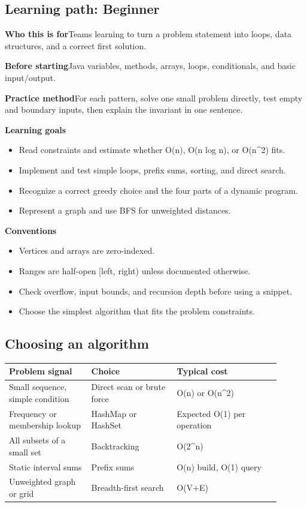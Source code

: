 \documentclass[10pt,letterpaper]{article}
\newcommand{\entrylabel}[1]{\textcolor{accent}{\bfseries #1}}
\begin{document}
\subsection*{Learning path: Beginner}
\begin{guidebox}\entrylabel{Who this is for}\quad Teams learning to turn a problem statement into loops, data structures, and a correct first solution.\par
\entrylabel{Before starting}\quad Java variables, methods, arrays, loops, conditionals, and basic input/output.\par
\entrylabel{Practice method}\quad For each pattern, solve one small problem directly, test empty and boundary inputs, then explain the invariant in one sentence.\end{guidebox}
\textbf{Learning goals}\begin{itemize}
\item Read constraints and estimate whether O(n), O(n log n), or O(n\textasciicircum{}2) fits.
\item Implement and test simple loops, prefix sums, sorting, and direct search.
\item Recognize a correct greedy choice and the four parts of a dynamic program.
\item Represent a graph and use BFS for unweighted distances.
\end{itemize}
\begin{guidebox}\textbf{Conventions}\begin{itemize}
\item Vertices and arrays are zero-indexed.
\item Ranges are half-open [left, right) unless documented otherwise.
\item Check overflow, input bounds, and recursion depth before using a snippet.
\item Choose the simplest algorithm that fits the problem constraints.
\end{itemize}\end{guidebox}
\subsection*{Choosing an algorithm}
\small\begin{longtable}{>{\raggedright\arraybackslash}p{0.27\linewidth}>{\raggedright\arraybackslash}p{0.29\linewidth}>{\raggedright\arraybackslash}p{0.34\linewidth}}\toprule
\textbf{Problem signal} & \textbf{Choice} & \textbf{Typical cost}\\\midrule\endhead
Small sequence, simple condition & Direct scan or brute force & O(n) or O(n\textasciicircum{}2)\\
Frequency or membership lookup & HashMap or HashSet & Expected O(1) per operation\\
All subsets of a small set & Backtracking & O(2\textasciicircum{}n)\\
Static interval sums & Prefix sums & O(n) build, O(1) query\\
Unweighted graph or grid & Breadth-first search & O(V+E)\\
\bottomrule\end{longtable}\normalsize
\end{document}
